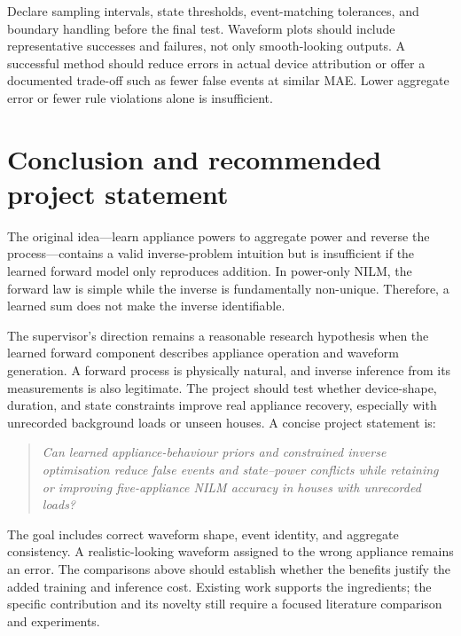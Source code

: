 \documentclass[11pt]{article}
\begin{document}
Declare sampling intervals, state thresholds, event-matching tolerances, and boundary handling before the final test. Waveform plots should include representative successes and failures, not only smooth-looking outputs. A successful method should reduce errors in actual device attribution or offer a documented trade-off such as fewer false events at similar MAE. Lower aggregate error or fewer rule violations alone is insufficient.

\section{Conclusion and recommended project statement}

The original idea---learn appliance powers to aggregate power and reverse the process---contains a valid inverse-problem intuition but is insufficient if the learned forward model only reproduces addition. In power-only NILM, the forward law is simple while the inverse is fundamentally non-unique. Therefore, a learned sum does not make the inverse identifiable.

The supervisor's direction remains a reasonable research hypothesis when the learned forward component describes appliance operation and waveform generation. A forward process is physically natural, and inverse inference from its measurements is also legitimate. The project should test whether device-shape, duration, and state constraints improve real appliance recovery, especially with unrecorded background loads or unseen houses. A concise project statement is:

\begin{quote}
\emph{Can learned appliance-behaviour priors and constrained inverse optimisation reduce false events and state--power conflicts while retaining or improving five-appliance NILM accuracy in houses with unrecorded loads?}
\end{quote}

The goal includes correct waveform shape, event identity, and aggregate consistency. A realistic-looking waveform assigned to the wrong appliance remains an error. The comparisons above should establish whether the benefits justify the added training and inference cost. Existing work supports the ingredients; the specific contribution and its novelty still require a focused literature comparison and experiments.
\end{document}
